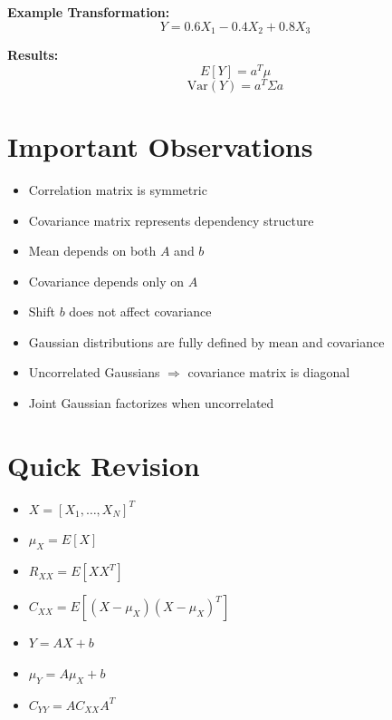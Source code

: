 \documentclass[11pt]{article}
\begin{document}
\textbf{Example Transformation:}
\[
Y = 0.6X_1 - 0.4X_2 + 0.8X_3
\]

\textbf{Results:}
\[
E[Y] = a^T \mu
\]
\[
\mathrm{Var}(Y) = a^T \Sigma a
\]

\vspace{1cm}
\section{Important Observations}

\begin{itemize}
    \item Correlation matrix is symmetric
    \item Covariance matrix represents dependency structure
    \item Mean depends on both $A$ and $b$
    \item Covariance depends only on $A$
    \item Shift $b$ does not affect covariance
    \item Gaussian distributions are fully defined by mean and covariance
    \item Uncorrelated Gaussians $\Rightarrow$ covariance matrix is diagonal
    \item Joint Gaussian factorizes when uncorrelated
\end{itemize}

\vspace{1cm}
\section{Quick Revision}

\begin{itemize}
    \item $X = [X_1, \dots, X_N]^T$
    \item $\mu_X = E[X]$
    \item $R_{XX} = E[XX^T]$
    \item $C_{XX} = E[(X - \mu_X)(X - \mu_X)^T]$
    \item $Y = AX + b$
    \item $\mu_Y = A\mu_X + b$
    \item $C_{YY} = AC_{XX}A^T$
\end{itemize}
\end{document}
